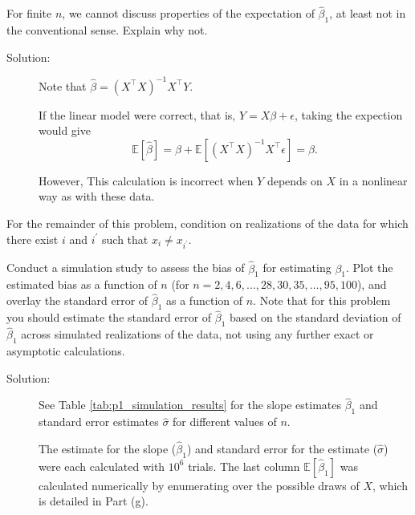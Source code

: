 \documentclass[11pt, letterpaper]{article}
\begin{document}
{\begin{enumerate}[(a)]
{\item For finite $n$, we cannot discuss properties of the expectation of $\hat{\beta}_1$, at least not in the conventional sense.  Explain why not.}

\begin{description}
\item[Solution:] Note that
  $\hat{\beta} = \left(X^\intercal X\right)^{-1} X^\intercal Y$.  

  If the linear model were correct, that is, $Y = X\beta + \epsilon$, taking the
  expection would give
  \begin{equation}
    \mathbb{E}\left[\hat{\beta}\right]
    = \beta + \mathbb{E}\left[
      \left( X^\intercal X \right)^{-1} X^\intercal \epsilon
    \right] = \beta.
  \end{equation}

  However, This calculation is incorrect when $Y$ depends on $X$ in a nonlinear
  way as with these data.
\end{description}

\end{enumerate}
For the remainder of this problem, condition on realizations of the data for which there exist $i$ and $i^\prime$ such that $x_i \neq x_{i^\prime}$.
\begin{enumerate}[(a)] \addtocounter{enumi}{4}
{\item Conduct a simulation study to assess the bias of $\hat{\beta}_1$ for estimating $\beta_1$.  Plot the estimated bias as a function of $n$ (for $n=2,4,6,\ldots,28,30,35,\ldots,95,100$), and overlay the standard error of $\hat{\beta}_1$ as a function of $n$.  Note that for this problem you should estimate the standard error of $\hat{\beta}_1$ based on the 
  standard deviation of $\hat{\beta}_1$ across simulated realizations of the data, not using any further exact or asymptotic calculations.}

\begin{description}
\item[Solution:] See Table \ref{tab:p1_simulation_results} for the slope
  estimates $\hat{\beta}_1$ and standard error estimates $\hat{\sigma}$ for
  different values of $n$.

  \begin{table}
    \centering
    
    \caption{The estimate for the slope ($\hat{\beta}_1$) and standard error for
      the estimate ($\hat{\sigma}$) were each calculated with $10^6$ trials. The
      last column $\mathbb{E}\left[\hat{\beta}_1\right]$ was calculated
      numerically by enumerating over the possible draws of $X$, which is detailed in Part (g).}
    \label{tab:p1_simulation_results}
  \end{table}


\end{description}
\end{enumerate}}
\end{document}
